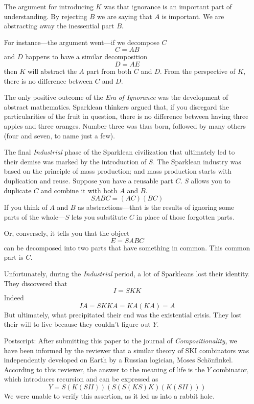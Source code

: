 \documentclass[11pt]{amsart}
\begin{document}
The argument for introducing $K$ was that ignorance is an important part of understanding. By rejecting $B$ we are saying that $A$ is important. We are abstracting away the inessential part $B$. 

For instance---the argument went---if we decompose $C$
 \[ C = A B\]
and $D$ happens to have a similar decomposition
 \[ D = A E\]
then $K$ will abstract the $A$ part from both $C$ and $D$. From the perspective of $K$, there is no difference between $C$ and $D$. 

The only positive outcome of the \emph{Era of Ignorance} was the development of abstract mathematics. Sparklean thinkers argued that, if you disregard the particularities of the fruit in question, there is no difference between having three apples and three oranges. Number three was thus born, followed by many others (four and seven, to name just a few).

The final \emph{Industrial} phase of the Sparklean civilization that ultimately led to their demise was marked by the introduction of $S$. The Sparklean industry was based on the principle of mass production; and mass production starts with duplication and reuse. Suppose you have a reusable part $C$. $S$ allows you to duplicate $C$ and combine it with both $A$ and $B$. 
 \[ S A B C = (A C) (B C)\]
If you think of $A$ and $B$ as abstractions---that is the results of ignoring some parts of the whole---$S$ lets you substitute $C$ in place of those forgotten parts. 

Or, conversely, it tells you that the object
 \[ E = S A B C\]
can be decomposed into two parts that have something in common. This common part is $C$.

Unfortunately, during the \emph{Industrial} period, a lot of Sparkleans lost their identity. They discovered that
 \[ I = S K K\]
Indeed
 \[ I A = S K K A = K A (K A) = A\]
But ultimately, what precipitated their end was the existential crisis. They lost their will to live because they couldn't figure out $Y$.

Postscript: After submitting this paper to the journal of \emph{Compositionality}, we have been informed by the reviewer that a similar theory of SKI combinators was independently developed on Earth by a Russian logician, Moses Schönfinkel. According to this reviewer, the answer to the meaning of life is the $Y$ combinator, which introduces recursion and can be expressed as 
 \[ Y = S(K(SII))(S(S(KS)K)(K(SII)))\]
We were unable to verify this assertion, as it led us into a rabbit hole.
\end{document}
